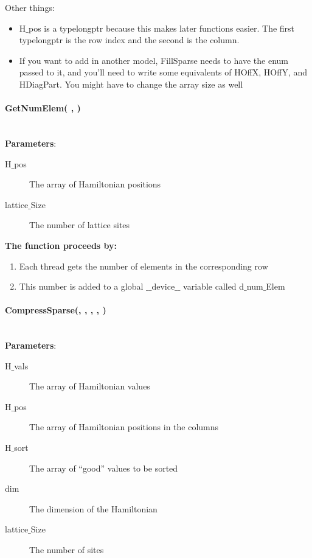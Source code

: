 \documentclass{article}
\begin{document}
Other things:
\begin{itemize}
\item{H$\_$pos is a typelongptr because this makes later functions easier. The first typelongptr is the row index and the second is the column.}
\item{If you want to add in another model, FillSparse needs to have the enum passed to it, and you'll need to write some equivalents of HOffX, HOffY, and HDiagPart. You might have to change the array size as well}
\end{itemize}

\paragraph{\cudaglobal \void GetNumElem( \typelongtwoptr , \int ) \\ \\}
\noindent\textbf{Parameters}:
\begin{description}
\item[\typelongtwoptr H$\_$pos] The array of Hamiltonian positions
\item[\int lattice$\_$Size] The number of lattice sites
\end{description}

\noindent\textbf{The function proceeds by:}
\begin{enumerate}
\item{Each thread gets the number of elements in the corresponding row}
\item{This number is added to a global $\_\_$device$\_\_$ variable called d$\_$num$\_$Elem}
\end{enumerate}

\paragraph{\cudaglobal \void CompressSparse(\cuDoubleComplex , \typelongtwoptr , \hamstruct , \int , \const \int ) \\ \\}
\noindent\textbf{Parameters}:
\begin{description}
\item[\cuDoubleComplex H$\_$vals] The array of Hamiltonian values
\item[\typelongtwoptr H$\_$pos] The array of Hamiltonian positions in the columns
\item[\hamstruct H$\_$sort] The array of ``good'' values to be sorted
\item[\long dim] The dimension of the Hamiltonian
\item[\int lattice$\_$Size] The number of sites
\end{description}
\end{document}
